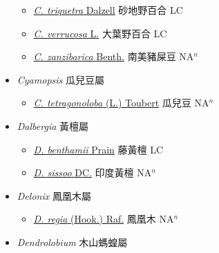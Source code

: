 \begin{itemize}
\begin{itemize}
        \item[] \href{http://www.theplantlist.org/tpl1.1/search?q=Crotalaria+triquetra}{\textit{C. triquetra} Dalzell}   砂地野百合 LC
        \item[] \href{http://www.theplantlist.org/tpl1.1/search?q=Crotalaria+verrucosa}{\textit{C. verrucosa} L.}   大葉野百合 LC
        \item[] \href{http://www.theplantlist.org/tpl1.1/search?q=Crotalaria+zanzibarica}{\textit{C. zanzibarica} Benth.}   南美豬屎豆 NA$^n$
  \end{itemize}
 \item[] \textit{Cyamopsis} 瓜兒豆屬
                    
  \begin{itemize}
        \item[] \href{http://www.theplantlist.org/tpl1.1/search?q=Cyamopsis+tetragonoloba}{\textit{C. tetragonoloba} (L.) Toubert}   瓜兒豆 NA$^n$
  \end{itemize}
 \item[] \textit{Dalbergia} 黃檀屬
                    
  \begin{itemize}
        \item[] \href{http://www.theplantlist.org/tpl1.1/search?q=Dalbergia+benthamii}{\textit{D. benthamii} Prain}   藤黃檀 LC
        \item[] \href{http://www.theplantlist.org/tpl1.1/search?q=Dalbergia+sissoo}{\textit{D. sissoo} DC.}   印度黃檀 NA$^n$
  \end{itemize}
 \item[] \textit{Delonix} 鳳凰木屬
                    
  \begin{itemize}
        \item[] \href{http://www.theplantlist.org/tpl1.1/search?q=Delonix+regia}{\textit{D. regia} (Hook.) Raf.}   鳳凰木 NA$^n$
  \end{itemize}
 \item[] \textit{Dendrolobium} 木山螞蝗屬
                    

\end{itemize}
